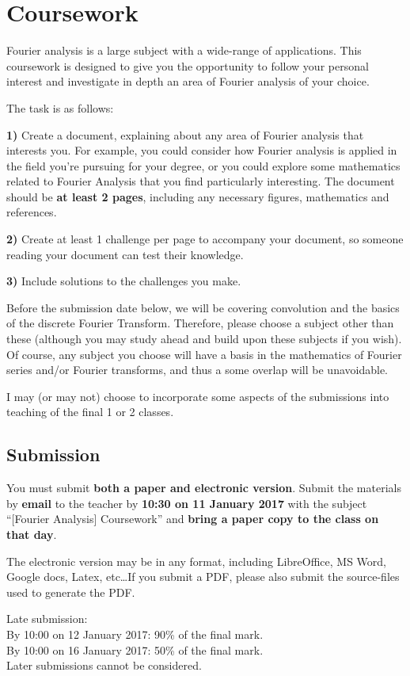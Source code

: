 \newpage
\section{Coursework}
Fourier analysis is a large subject with a wide-range of applications. This coursework is designed to give you the opportunity to follow your personal interest and investigate in depth an area of Fourier analysis of your choice.

The task is as follows:

\textbf{1)} Create a document, explaining about any area of Fourier analysis that interests you. For example, you could consider how Fourier analysis is applied in the field you're pursuing for your degree, or you could explore some mathematics related to Fourier Analysis that you find particularly interesting. The document should be \textbf{at least 2 pages}, including any necessary figures, mathematics and references.

\textbf{2)} Create at least 1 challenge per page to accompany your document, so someone reading your document can test their knowledge.

\textbf{3)} Include solutions to the challenges you make.

Before the submission date below, we will be covering convolution and the basics of the discrete Fourier Transform. Therefore, please choose a subject other than these (although you may study ahead and build upon these subjects if you wish). Of course, any subject you choose will have a basis in the mathematics of Fourier series and/or Fourier transforms, and thus a some overlap will be unavoidable.

I may (or may not) choose to incorporate some aspects of the submissions into teaching of the final 1 or 2 classes.

\subsection{Submission}
You must submit \textbf{both a paper and electronic version}. Submit the materials by \textbf{email} to the teacher by \textbf{10:30 on 11 January 2017} with the subject ``[Fourier Analysis] Coursework'' and \textbf{bring a paper copy to the class on that day}.

The electronic version may be in any format, including LibreOffice, MS Word, Google docs, Latex, etc\ldots If you submit a PDF, please also submit the source-files used to generate the PDF.

Late submission:\\
By 10:00 on 12 January 2017: 90\% of the final mark.\\
By 10:00 on 16 January 2017: 50\% of the final mark.\\
Later submissions cannot be considered.

